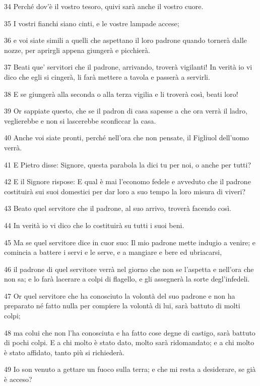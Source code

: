 \par 34 Perché dov'è il vostro tesoro, quivi sarà anche il vostro cuore.
\par 35 I vostri fianchi siano cinti, e le vostre lampade accese;
\par 36 e voi siate simili a quelli che aspettano il loro padrone quando tornerà dalle nozze, per aprirgli appena giungerà e picchierà.
\par 37 Beati que' servitori che il padrone, arrivando, troverà vigilanti! In verità io vi dico che egli si cingerà, li farà mettere a tavola e passerà a servirli.
\par 38 E se giungerà alla seconda o alla terza vigilia e li troverà così, beati loro!
\par 39 Or sappiate questo, che se il padron di casa sapesse a che ora verrà il ladro, veglierebbe e non si lascerebbe sconficcar la casa.
\par 40 Anche voi siate pronti, perché nell'ora che non pensate, il Figliuol dell'uomo verrà.
\par 41 E Pietro disse: Signore, questa parabola la dici tu per noi, o anche per tutti?
\par 42 E il Signore rispose: E qual è mai l'economo fedele e avveduto che il padrone costituirà sui suoi domestici per dar loro a suo tempo la loro misura di viveri?
\par 43 Beato quel servitore che il padrone, al suo arrivo, troverà facendo così.
\par 44 In verità io vi dico che lo costituirà su tutti i suoi beni.
\par 45 Ma se quel servitore dice in cuor suo: Il mio padrone mette indugio a venire; e comincia a battere i servi e le serve, e a mangiare e bere ed ubriacarsi,
\par 46 il padrone di quel servitore verrà nel giorno che non se l'aspetta e nell'ora che non sa; e lo farà lacerare a colpi di flagello, e gli assegnerà la sorte degl'infedeli.
\par 47 Or quel servitore che ha conosciuto la volontà del suo padrone e non ha preparato né fatto nulla per compiere la volontà di lui, sarà battuto di molti colpi;
\par 48 ma colui che non l'ha conosciuta e ha fatto cose degne di castigo, sarà battuto di pochi colpi. E a chi molto è stato dato, molto sarà ridomandato; e a chi molto è stato affidato, tanto più si richiederà.
\par 49 Io son venuto a gettare un fuoco sulla terra; e che mi resta a desiderare, se già è acceso?
